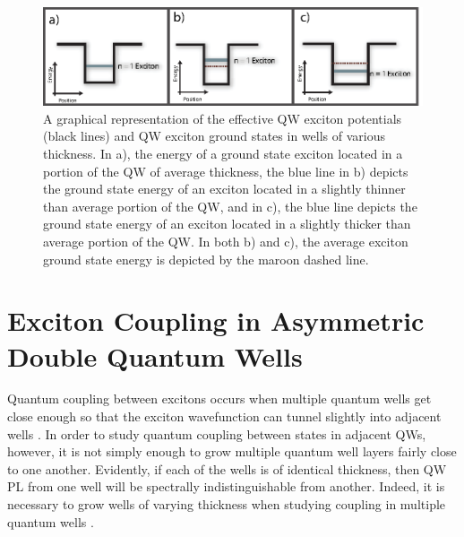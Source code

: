 \begin{figure}[t!]
\label{rel-thickness}
\centering
\includegraphics[width = .9\textwidth]{rel-thickness.eps}
\caption{\doublespacing A graphical representation of the effective QW exciton potentials (black lines) and QW exciton ground states in wells of various thickness. In a), the energy of a ground state exciton located in a portion of the QW of average thickness, the blue line in b) depicts the ground state energy of an exciton located in a slightly thinner than average portion of the QW,  and in c), the blue line depicts the ground state energy of an exciton located in a slightly thicker than average portion of the QW. In both b) and c), the average exciton ground state energy is depicted by the maroon dashed line.}
\end{figure}

\section{Exciton Coupling in Asymmetric Double Quantum Wells}

\indent Quantum coupling between excitons occurs when multiple quantum wells get close enough so that the exciton wavefunction can tunnel slightly into adjacent wells \cite{griffiths, davies}. In order to study quantum coupling between states in adjacent QWs, however, it is not simply enough to grow multiple quantum well layers fairly close to one another. Evidently, if each of the wells is of identical thickness, then QW PL  from one well will be spectrally indistinguishable from another. Indeed, it is necessary to grow wells of varying thickness when studying coupling in multiple quantum wells \cite{hegartycouple}.  

